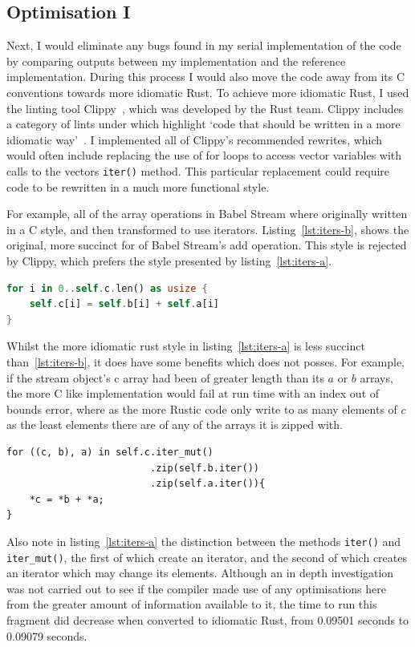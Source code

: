 \subsection{Optimisation I}
Next, I would eliminate any bugs found in my serial implementation of the code by comparing outputs between my implementation and the reference implementation. During this process I would also move the code away from its C conventions towards more idiomatic Rust. To achieve more idiomatic Rust, I used the linting tool Clippy~\cite{RustClippy}, which was developed by the Rust team.  Clippy includes a category of lints under  which highlight `code that should be written in a more idiomatic way'~\cite{RustClippy}. I implemented all of Clippy's recommended rewrites, which would often include replacing the use of for loops to access vector variables with calls to the vectors \texttt{iter()} method. This particular replacement could require code to be rewritten in a much more functional style.

For example, all of the array operations in Babel Stream where originally written in a C style, and then transformed to use iterators. Listing~\ref{lst:iters-b}, shows the original, more succinct for of Babel Stream's add operation. This style is rejected by Clippy, which prefers the style presented by listing~\ref{lst:iters-a}.
\begin{lstlisting}[language=Rust, label=lst:iters-b, caption={Babel Stream Add, before applying idiomatic Rust style}]
for i in 0..self.c.len() as usize {
    self.c[i] = self.b[i] + self.a[i]
}
\end{lstlisting}
Whilst the more idiomatic rust style in listing~\ref{lst:iters-a} is less succinct than~\ref{lst:iters-b}, it does have some benefits which does not posses. For example, if the stream object's c array had been of greater length than its $a$ or $b$ arrays, the more C like implementation would fail at run time with an index out of bounds error, where as the more Rustic code only write to as many elements of $c$ as the least elements there are of any of the arrays it is zipped with.
\begin{verbatim}
for ((c, b), a) in self.c.iter_mut()
                         .zip(self.b.iter())
                         .zip(self.a.iter()){
    *c = *b + *a;
}
\end{verbatim}
Also note in listing~\ref{lst:iters-a} the distinction between the methods \texttt{iter()} and \texttt{iter\_mut()}, the first of which create an iterator, and the second of which creates an iterator which may change its elements. Although an in depth investigation was not carried out to see if the compiler made use of any optimisations here from the greater amount of information available to it, the time to run this fragment did decrease when converted to idiomatic Rust, from 0.09501 seconds to 0.09079 seconds.

